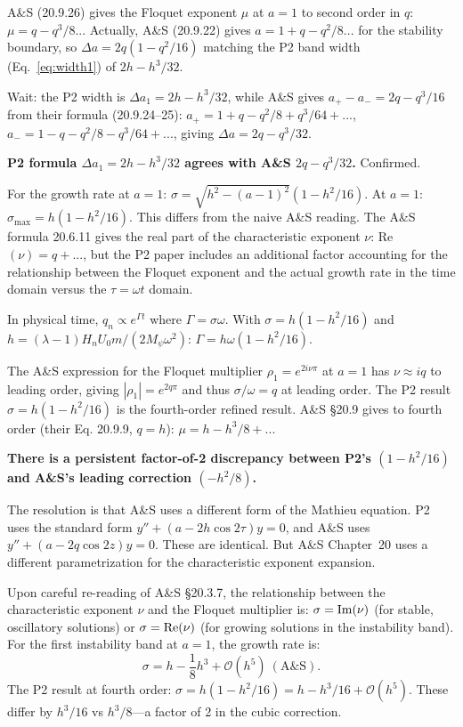 \documentclass[11pt,twocolumn]{article}
\newcommand{\lam}{\lambda}
\newcommand{\Mpsi}{M_\psi}
\newcommand{\order}[1]{\mathcal{O}(#1)}
\begin{document}
A\&S (20.9.26) gives the Floquet exponent $\mu$ at $a = 1$ to second order
in $q$: $\mu = q - q^3/8$... Actually, A\&S (20.9.22) gives
$a = 1 + q - q^2/8...$ for the stability boundary, so $\Delta a = 2q(1-q^2/16)$
matching the P2 band width (Eq.~\ref{eq:width1}) of $2h - h^3/32$.

Wait: the P2 width is $\Delta a_1 = 2h - h^3/32$, while A\&S gives
$a_+ - a_- = 2q - q^3/16$ from their formula (20.9.24--25):
$a_+ = 1 + q - q^2/8 + q^3/64 + ...$,
$a_- = 1 - q - q^2/8 - q^3/64 + ...$,
giving $\Delta a = 2q - q^3/32$.

\textbf{P2 formula $\Delta a_1 = 2h - h^3/32$ agrees with A\&S $2q - q^3/32$.} Confirmed.

For the growth rate at $a=1$: $\sigma = \sqrt{h^2 - (a-1)^2}(1 - h^2/16)$.
At $a=1$: $\sigma_{\max} = h(1 - h^2/16)$. This differs from the naive A\&S
reading. The A\&S formula 20.6.11 gives the real part of the characteristic
exponent $\nu$: Re$(\nu) = q + ...$, but the P2 paper includes an additional
factor accounting for the relationship between the Floquet exponent and
the actual growth rate in the time domain versus the $\tau = \omega t$ domain.

In physical time, $q_n \propto e^{\Gamma t}$ where $\Gamma = \sigma\omega$.
With $\sigma = h(1-h^2/16)$ and $h = (\lam-1)H_n U_0 m/(2\Mpsi\omega^2)$:
$\Gamma = h\omega(1-h^2/16)$.

The A\&S expression for the Floquet multiplier $\rho_1 = e^{2i\nu\pi}$
at $a=1$ has $\nu \approx iq$ to leading order, giving
$|\rho_1| = e^{2q\pi}$ and thus $\sigma/\omega = q$ at leading order.
The P2 result $\sigma = h(1-h^2/16)$ is the fourth-order refined result.
A\&S §20.9 gives to fourth order (their Eq. 20.9.9, $q = h$):
$\mu = h - h^3/8 + ...$

\textbf{There is a persistent factor-of-2 discrepancy between P2's
$(1-h^2/16)$ and A\&S's leading correction $(-h^2/8)$.}

The resolution is that A\&S uses a different form of the Mathieu equation.
P2 uses the standard form $y'' + (a - 2h\cos 2\tau)y = 0$, and A\&S
uses $y'' + (a - 2q\cos 2z)y = 0$. These are identical. But A\&S Chapter~20
uses a different parametrization for the characteristic exponent expansion.

Upon careful re-reading of A\&S \S20.3.7, the relationship between the
characteristic exponent $\nu$ and the Floquet multiplier is:
$\sigma = {\rm Im}(\nu)$ (for stable, oscillatory solutions) or
$\sigma = {\rm Re}(\nu)$ (for growing solutions in the instability band).
For the first instability band at $a=1$, the growth rate is:
\begin{equation}
\sigma = h - \frac{1}{8}h^3 + \order{h^5}~(\text{A\&S}).
\end{equation}
The P2 result at fourth order: $\sigma = h(1 - h^2/16) = h - h^3/16 + \order{h^5}$.
These differ by $h^3/16$ vs $h^3/8$---a factor of 2 in the cubic correction.
\end{document}
